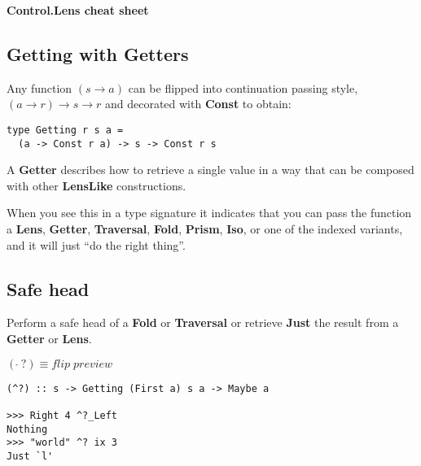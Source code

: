 

\addtolength{\wpXoffset}{5.5cm}
\addtolength{\wpYoffset}{13.1cm}





{\huge \bfseries Control.Lens cheat sheet \\[0.2cm]}

\HRule%

\begin{multicols}{2}

\begin{box1}
\subsection *{Getting with Getters}

Any function $(s \to a)$ can be flipped into continuation passing style, $(a \to r)
\to s \to r$ and decorated with \textbf{Const} to obtain:

\begin{verbatim}
type Getting r s a =
  (a -> Const r a) -> s -> Const r s
\end{verbatim}
A \textbf{Getter} describes how to retrieve a single value in a way that can be composed
with other \textbf{LensLike} constructions.

When you see this in a type signature it indicates that you can pass the
function a \textbf{Lens}, \textbf{Getter}, \textbf{Traversal}, \textbf{Fold},
\textbf{Prism}, \textbf{Iso}, or one of the indexed
variants, and it will just ``do the right thing''.
\end{box1}

\begin{box2}
\subsection *{Safe head}
Perform a safe head of a \textbf{Fold} or \textbf{Traversal} or retrieve
\textbf{Just} the result from a \textbf{Getter} or \textbf{Lens}.

$ (\ \hat{}\,?) \equiv flip\;preview $

\begin{verbatim}
(^?) :: s -> Getting (First a) s a -> Maybe a

>>> Right 4 ^?_Left
Nothing
>>> "world" ^? ix 3
Just `l'
\end{verbatim}
\end{box2}


\end{multicols}
